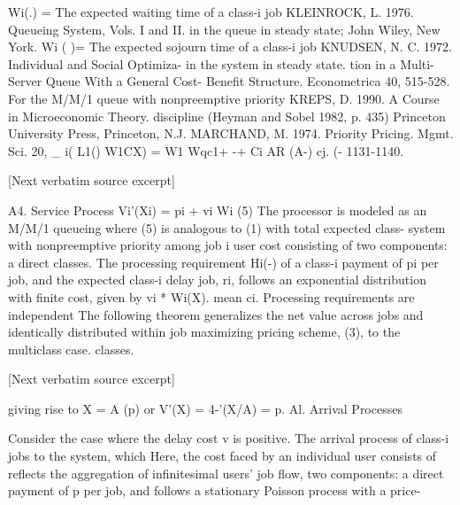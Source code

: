 \documentclass[10pt]{article}
\begin{document}
\begin{ReviewVerbatim}
Wi(.) = The expected waiting time of a class-i job                      KLEINROCK, L. 1976. Queueing System, Vols. I and II.
         in the queue in steady state;                                       John Wiley, New York.
 Wi ( )= The expected sojourn time of a class-i job                     KNUDSEN, N. C. 1972. Individual and Social Optimiza-
         in the system in steady state.                                      tion in a Multi-Server Queue With a General Cost-
                                                                             Benefit Structure. Econometrica 40, 515-528.
For the M/M/1 queue with nonpreemptive priority                         KREPS, D. 1990. A Course in Microeconomic Theory.
discipline (Heyman and Sobel 1982, p. 435)                                 Princeton University Press, Princeton, N.J.
                                                                        MARCHAND, M. 1974. Priority Pricing. Mgmt. Sci. 20,
   _ i( L1()
 W1CX)  = W1 Wqc1+ -+
                   Ci AR   (A-)
                      cj. (-                                                  1131-1140.

[Next verbatim source excerpt]

A4. Service Process                                                      Vi'(Xi) = pi + vi Wi (5)
The processor is modeled as an M/M/1 queueing                          where (5) is analogous to (1) with total expected class-
system with nonpreemptive priority among job                           i user cost consisting of two components: a direct
classes. The processing requirement Hi(-) of a class-i                 payment of pi per job, and the expected class-i delay
job, ri, follows an exponential distribution with finite cost, given by vi * Wi(X).
mean ci. Processing requirements are independent           The following theorem generalizes the net value
across jobs and identically distributed within job       maximizing pricing scheme, (3), to the multiclass case.
classes.

[Next verbatim source excerpt]

giving rise to X = A (p) or V'(X) = 4-'(X/A) = p.                     Al. Arrival Processes

  Consider the case where the delay cost v is positive.               The arrival process of class-i jobs to the system, which
Here, the cost faced by an individual user consists of                reflects the aggregation of infinitesimal users' job flow,
two components: a direct payment of p per job, and                    follows a stationary Poisson process with a price-





\end{ReviewVerbatim}
\end{document}
